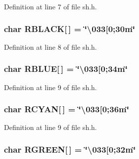 Definition at line 7 of file sh.\+h.

\subsubsection[{\texorpdfstring{R\+B\+L\+A\+CK}{RBLACK}}]{\setlength{\rightskip}{0pt plus 5cm}char R\+B\+L\+A\+CK\mbox{[}$\,$\mbox{]} = \char`\"{}\textbackslash{}033\mbox{[}0;30m\char`\"{}}\hypertarget{namespace_k_a1203c8bea34ade1c1d524b0df5bfdf37}{}\label{namespace_k_a1203c8bea34ade1c1d524b0df5bfdf37}


Definition at line 8 of file sh.\+h.

\subsubsection[{\texorpdfstring{R\+B\+L\+UE}{RBLUE}}]{\setlength{\rightskip}{0pt plus 5cm}char R\+B\+L\+UE\mbox{[}$\,$\mbox{]} = \char`\"{}\textbackslash{}033\mbox{[}0;34m\char`\"{}}\hypertarget{namespace_k_a035ca76c4d8abd4253d53e1dfb952368}{}\label{namespace_k_a035ca76c4d8abd4253d53e1dfb952368}


Definition at line 9 of file sh.\+h.

\subsubsection[{\texorpdfstring{R\+C\+Y\+AN}{RCYAN}}]{\setlength{\rightskip}{0pt plus 5cm}char R\+C\+Y\+AN\mbox{[}$\,$\mbox{]} = \char`\"{}\textbackslash{}033\mbox{[}0;36m\char`\"{}}\hypertarget{namespace_k_a816b9af371d1741fead9f73abb978052}{}\label{namespace_k_a816b9af371d1741fead9f73abb978052}


Definition at line 9 of file sh.\+h.

\subsubsection[{\texorpdfstring{R\+G\+R\+E\+EN}{RGREEN}}]{\setlength{\rightskip}{0pt plus 5cm}char R\+G\+R\+E\+EN\mbox{[}$\,$\mbox{]} = \char`\"{}\textbackslash{}033\mbox{[}0;32m\char`\"{}}\hypertarget{namespace_k_a9c4858b8b93beb509648e92071d727ca}{}\label{namespace_k_a9c4858b8b93beb509648e92071d727ca}


